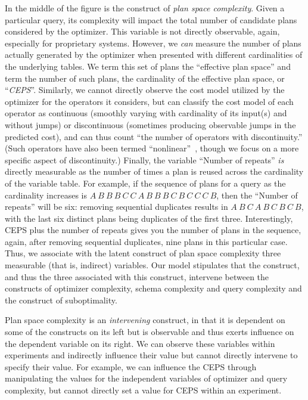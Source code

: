 \documentclass[prodmode,acmtods]{acmsmall}
\begin{document}
In the middle of the figure is the construct of {\em plan space
complexity}. Given a particular query, its
complexity will impact the total number of candidate plans considered
by the optimizer. This variable is not directly
observable, again, especially for proprietary \hbox{systems}. However, we {\em
can} measure the number of plans actually generated by the optimizer
when presented with different cardinalities of the underlying tables.
We term this set of plans the ``effective plan
space'' and term the number of such plans, the cardinality of the
effective plan space, or ``{\em CEPS}''. Similarly, we cannot directly observe
the cost model utilized by the optimizer for the operators it considers, but
can classify the cost model of each operator as continuous (smoothly varying
with cardinality of its input(s) and without jumps) or discontinuous
(sometimes producing observable jumps in the predicted
cost), and can thus count ``the number of operators with
discontinuity.'' (Such operators have also been termed
``nonlinear''~\cite{Hulgen03}, though we focus on a more specific aspect of
discontinuity.) Finally, the variable ``Number of repeats'' {\em is}
directly measurable as the number
of times a plan is reused across the cardinality of the variable table. For
example, if the sequence of plans for a query as the cardinality increases
is $A ~ B ~ B ~ B ~ C ~ C ~ A ~ B ~ B~ B ~ C ~ B ~ C ~ C ~ C ~ B$, then the
``Number of repeats'' will be six: removing sequential duplicates results in $A ~ B ~ C
~ A ~ B ~ C ~ B ~ C ~ B$, with the last six distinct plans being duplicates
of the first three. Interestingly, CEPS plus the number of repeats gives you the
number of plans in the sequence, again, after removing sequential
duplicates, nine plans in this particular case. Thus, we associate with the latent construct
of plan space complexity three measurable (that is, indirect) variables. Our
  model stipulates that the construct, and thus the three associated with
  this construct, intervene between the constructs of optimizer complexity,
  schema complexity and query complexity and the construct of suboptimality.

Plan space complexity is an {\em intervening} construct, in that it is dependent
on some of the constructs on its left but is observable and thus exerts influence on the dependent
variable on its right. We can observe these variables within experiments and
indirectly influence their value but
cannot directly intervene to specify their value. For example, we can influence the CEPS through
manipulating the values for the independent variables of optimizer and query
complexity, but cannot directly set a value for CEPS within an
experiment.
\end{document}
